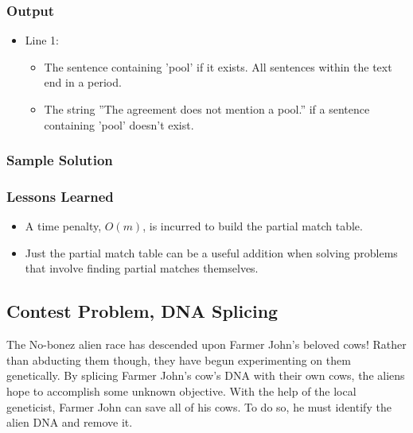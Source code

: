 \subsubsection{Output}
\begin{itemize}
	\item Line 1:
	\begin{itemize}
		\item The sentence containing 'pool' if it exists. All sentences within the text end in a period.
		\item The string ''The agreement does not mention a pool.'' if a sentence containing 'pool' doesn't exist.
	\end{itemize}
\end{itemize}


\subsubsection{Sample Solution}


\subsubsection{Lessons Learned}
\begin{itemize}
	\item A time penalty, $O(m)$, is incurred to build the partial match table.
	\item Just the partial match table can be a useful addition when solving problems that involve finding partial matches themselves.
\end{itemize}

\subsection{Contest Problem, DNA Splicing}
The No-bonez alien race has descended upon Farmer John's beloved cows!
Rather than abducting them though, they have begun experimenting on them genetically.
By splicing Farmer John's cow's DNA with their own cows, the aliens hope to accomplish some unknown objective.
With the help of the local geneticist, Farmer John can save all of his cows.
To do so, he must identify the alien DNA and remove it.

